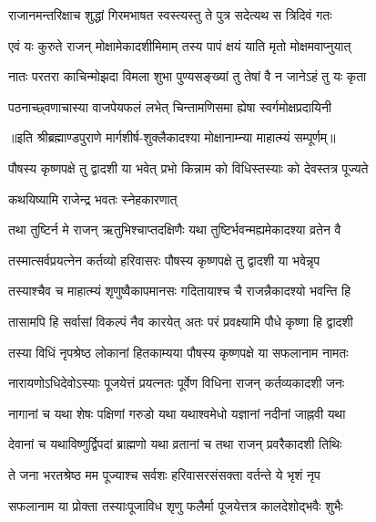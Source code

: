 \twolineshloka
{राजानमन्तरिक्षाच शुद्धां गिरमभाषत}
{स्वस्त्यस्तु ते पुत्र सदेत्यथ स त्रिदिवं गतः} %

\twolineshloka
{एवं यः कुरुते राजन् मोक्षामेकादशीमिमाम्}
{तस्य पापं क्षयं याति मृतो मोक्षमवाप्नुयात्} %

\twolineshloka
{नातः परतरा काचिन्मोझदा विमला शुभा}
{पुण्यसङ्ख्यां तु तेषां वै न जानेऽहं तु यः कृता} %

\twolineshloka
{पठनाच्छ्वणाचास्या वाजपेयफलं लभेत्}
{चिन्तामणिसमा ह्येषा स्वर्गमोक्षप्रदायिनी} %

॥इति श्रीब्रह्माण्डपुराणे मार्गशीर्ष-शुक्लैकादश्या मोक्षानाम्न्या माहात्म्यं सम्पूर्णम्॥



\twolineshloka
{पौषस्य कृष्णपक्षे तु द्वादशी या भवेत् प्रभो}
{किन्नाम को विधिस्तस्याः को देवस्तत्र पूज्यते} %



\onelineshloka
{कथयिष्यामि राजेन्द्र भवतः स्नेहकारणात्} %

\twolineshloka
{तथा तुष्टिर्न मे राजन् ऋतुभिश्चाप्तदक्षिणैः}
{यथा तुष्टिर्भवन्मह्यमेकादश्या व्रतेन वै} %

\twolineshloka
{तस्मात्सर्वप्रयत्नेन कर्तव्यो हरिवासरः}
{पौषस्य कृष्णपक्षे तु द्वादशी या भवेन्नृप} %

\twolineshloka
{तस्याश्चैव च माहात्म्यं शृणुष्वैकापमानसः}
{गदितायाश्च चै राजन्नैकादश्यो भवन्ति हि} %

\twolineshloka
{तासामपि हि सर्वासां विकल्पं नैव कारयेत्}
{अतः परं प्रवक्ष्यामि पौधे कृष्णा हि द्वादशी} %

\twolineshloka
{तस्या विधिं नृपश्रेष्ठ लोकानां हितकाम्यया}
{पौषस्य कृष्णपक्षे या सफलानाम नामतः} %

\twolineshloka
{नारायणोऽधिदेवोऽस्याः पूजयेत्तं प्रयत्नतः}
{पूर्वेण विधिना राजन् कर्तव्यकादशी जनः} %

\twolineshloka
{नागानां च यथा शेषः पक्षिणां गरुडो यथा}
{यथाश्वमेधो यज्ञानां नदीनां जाह्नवी यथा} %

\twolineshloka
{देवानां च यथाविष्णुर्द्विपदां ब्राह्मणो यथा}
{व्रतानां च तथा राजन् प्रवरैकादशी तिथिः} %

\twolineshloka
{ते जना भरतश्रेष्ठ मम पूज्याश्च सर्वशः}
{हरिवासरसंसक्ता वर्तन्ते ये भृशं नृप} %

\twolineshloka
{सफलानाम या प्रोक्ता तस्याःपूजाविध शृणु}
{फलैर्मा पूजयेत्तत्र कालदेशोद्भवैः शुभैः} %

